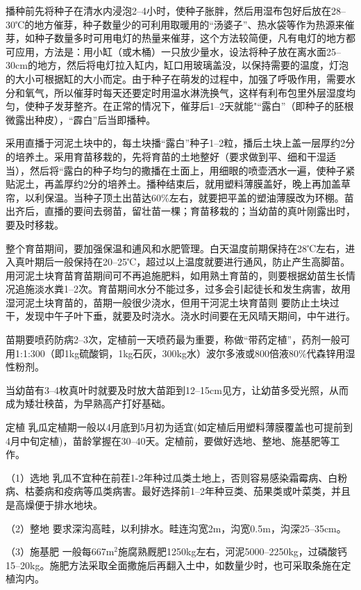 \documentclass{ctexbook}
\begin{document}
播种前先将种子在清水内浸泡2--4小时，使种子胀胖，然后用湿布包好后放在28--30℃的地方催芽，种子数量少的可利用取暖用的“汤婆子”、热水袋等作为热源来催芽，如种子数量多时可用电灯的热量来催芽，这个方法较简便，凡有电灯的地方都可应用，方法是：用小缸（或木桶）一只放少量水，设法将种子放在离水面25--30cm的地方，然后将电灯拉入缸内，缸口用玻璃盖没，以保持需要的温度，灯泡的大小可根据缸的大小而定。由于种子在萌发的过程中，加强了呼吸作用，需要水分和氧气，所以催芽时每天还要定时用温水淋洗换气，这样有利布包里外层湿度均匀，使种子发芽整齐。在正常的情况下，催芽后1--2天就能"“露白”（即种子的胚根微露出种皮），“霹白”后当即播种。

采用直播于河泥土块中的，每土块播“露白”种子1--2粒，播后土块上盖一层厚约2分的培养土。采用育苗移栽的，先将育苗的土地整好（要求做到平、细和干湿适当），然后将“露白的种子均匀的撒播在土面上，用细眼的喷壶洒水一遍，使种子紧贴泥土，再盖厚约2分的培养土。播种结束后，就用塑料薄膜盖好，晚上再加盖草帘，以利保温。当种子顶土出苗达60\%左右，就要把平盖的塑油薄膜改为环棚。苗出齐后，直播的要间去弱苗，留壮苗一棵；育苗移栽的；当幼苗的真叶刚露出时，要及时移栽。

整个育苗期间，要加强保温和逋风和水肥管理。白天温度前期保持在28℃左右，进入真叶期后一般保持在20--25℃，超过以上温度就要进行通风，防止产生高脚苗。用河泥土块育苗育苗期间可不再追施肥料，如用熟土育苗的，则要根据幼苗生长情况追施淡水粪1--2次。育苗期间水分不能过多，过多会引起徒长和发生病害，故用湿河泥土块育苗的，苗期一般很少浇水，但用干河泥土块育苗则
要防止土块过干，发现中午子叶下垂，就要及时浇水。浇水时间要在无风晴天期间，中午进行。

苗期要喷药防病2--3次，定植前一天喷药最为重要，称做“带药定植”，药剂一般可用1:1:300（即1kg硫酸铜，1kg石灰，300kg水）波尔多液或800倍液80\%代森锌用湿性粉剂。

当幼苗有3--4枚真叶时就要及时放大苗距到12--15cm见方，让幼苗多受光照，从而成为矮壮秧苗，为早熟高产打好基础。

定植 乳瓜定植期一般以4月底到5月初为适宜(如定植后用塑料薄膜覆盖也可提前到4月中旬定植)，苗龄掌握在30--40天。定植前，要做好选地、整地、施基肥等工作。

（1）选地 乳瓜不宜种在前茬1-2年种过瓜类土地上，否则容易感染霜霉病、白粉病、枯萎病和疫病等瓜类病害。最好选择前1--2年种豆类、茄果类或叶菜类，并且是高燥便于排水地块。

（2）整地 要求深沟高畦，以利排水。畦连沟宽2m，沟宽0.5m，沟深25--35cm。

（3）施基肥 一般每667m$^2$施腐熟厩肥1250kg左右，河泥5000--2250kg，过磷酸钙15--20kg。施肥方法采取全面撒施后再翻入土中，如数量少时，也可采取条施在定植沟内。
\end{document}

